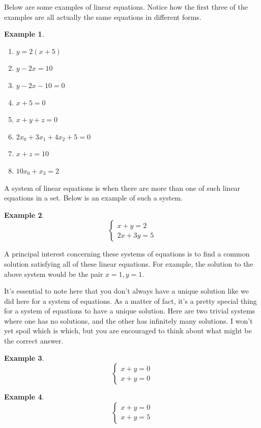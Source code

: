 \documentclass{scrbook}
\theoremstyle{definition}
\newtheorem{example}{Example}
\begin{document}
Below are some examples of linear equations. Notice how the first three of the examples are all actually the same equations in different forms.

\begin{example}
  \begin{enumerate}
    \item $y = 2(x + 5)$
    \item $y - 2x = 10$
    \item $y -2x -10 = 0$
    \item $x + 5 = 0$
    \item $x + y + z = 0$
    \item $2x_0 + 3x_1 + 4x_2 + 5 = 0$
    \item $x + z = 10$
    \item $10x_0 + x_3 = 2$
  \end{enumerate}
\end{example}

A system of linear equations is when there are more than one of such linear equations in a set. Below is an example of such a system.

\begin{example}
  \[
    \begin{cases}
      x + y = 2\\
      2x + 3y = 5
    \end{cases}
  \]
\end{example}

A principal interest concerning these systems of equations is to find a common solution satisfying all of these linear equations. For example, the solution to the above system would be the pair $x = 1, y = 1$. 

It's essential to note here that you don't always have a unique solution like we did here for a system of equations. As a matter of fact, it's a pretty special thing for a system of equations to have a unique solution. Here are two trivial systems where one has no solutions, and the other has infinitely many solutions. I won't yet spoil which is which, but you are encouraged to think about what might be the correct answer. 

\begin{example}
  \[
    \begin{cases}
      x + y = 0\\
      x + y = 0
    \end{cases}
  \]
\end{example}

\begin{example}
  \[
    \begin{cases}
      x + y = 0\\
      x + y = 5
    \end{cases}
  \]
\end{example}
\end{document}
